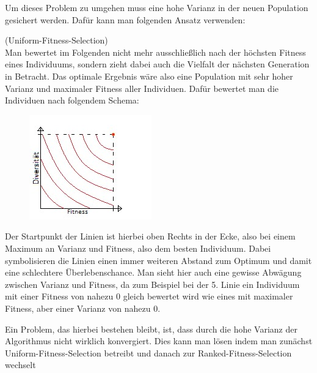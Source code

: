 Um dieses Problem zu umgehen muss eine hohe Varianz in der neuen Population gesichert werden. Dafür kann man folgenden Ansatz verwenden:
\begin{algo}(Uniform-Fitness-Selection)\\
	Man bewertet im Folgenden nicht mehr ausschließlich nach der höchsten Fitness eines Individuums, sondern zieht dabei auch die Vielfalt der nächsten Generation in Betracht. Das optimale Ergebnis wäre also eine Population mit sehr hoher Varianz und maximaler Fitness aller Individuen. Dafür bewertet man die Individuen nach folgendem Schema:
	\begin{figure}[h]
		\includegraphics[width=0.7\linewidth]{chapters/genetic/grafik.jpg}
	\end{figure}
	
	Der Startpunkt der Linien ist hierbei oben Rechts in der Ecke, also bei einem Maximum an Varianz und Fitness, also dem besten Individuum. Dabei symbolisieren die Linien einen immer weiteren Abstand zum Optimum und damit eine schlechtere Überlebenschance. Man sieht hier auch eine gewisse Abwägung zwischen Varianz und Fitness, da zum Beispiel bei der 5. Linie ein Individuum mit einer Fitness von nahezu 0 gleich bewertet wird wie eines mit maximaler Fitness, aber einer Varianz von nahezu 0.
	
	Ein Problem, das hierbei bestehen bleibt, ist, dass durch die hohe Varianz der Algorithmus nicht wirklich konvergiert. Dies kann man lösen indem man zunächst Uniform-Fitness-Selection betreibt und danach zur Ranked-Fitness-Selection wechselt
\end{algo}

